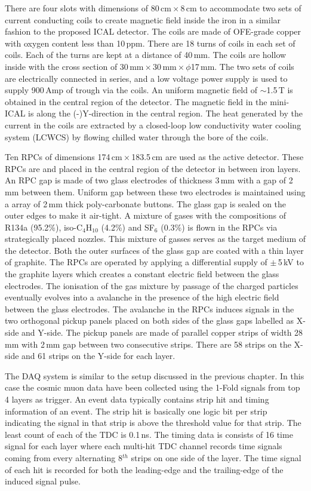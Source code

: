 There are four slots with dimensions of 80\,cm\,$\times$\,8\,cm to
accommodate two sets of current conducting coils to create magnetic
field inside the iron in a similar fashion to the proposed
ICAL detector. The coils are made of OFE-grade copper with
oxygen content less than 10\,ppm. There are 18 turns of coils in each
set of coils. Each of the turns are kept at a distance of 40\,mm.
The coils are hollow inside with the cross section of
30\,mm\,$\times$\,30\,mm\,$\times$\,$\phi$17\,mm.
The two sets of coils are electrically connected in series,
and a low voltage power supply is used to supply 900\,Amp
of trough via the coils. An uniform magnetic field of $\sim$1.5\,T
is obtained in the central region of the detector. The magnetic field
in the mini-ICAL is along the (-)Y-direction in the central region.
The heat generated by the current in the
coils are extracted by a closed-loop low conductivity water cooling
system (LCWCS) by flowing chilled water through the bore of the coils.

Ten RPCs of dimensions 174\,cm\,$\times$\,183.5\,cm are used as the
active detector. These RPCs are and placed in the central region of
the detector in between iron layers.
An RPC gap is made of two glass electrodes of thickness 3\,mm with
a gap of 2\,mm between them. Uniform gap between these two electrodes
is maintained using a array of 2\,mm thick poly-carbonate buttons.
The glass gap is sealed on the outer edges to make it air-tight.
A mixture of gases with the compositions of R134a (95.2\%),
iso-C$_4$H$_{10}$ (4.2\%) and SF$_6$ (0.3\%) is flown in the RPCs
via strategically placed nozzles. This mixture of gasses serves as the
target medium of the detector.
Both the outer surfaces of the glass gap are coated with a thin layer
of graphite. The RPCs are operated by applying a differential supply of
$\pm$\,5\,kV to the graphite layers which creates a constant electric
field between the glass electrodes. The ionisation of the gas mixture
by passage of the charged particles eventually evolves into a
avalanche in the presence of the high electric field between the glass
electrodes. The avalanche in the RPCs induces signals in the two
orthogonal pickup panels placed on both sides of the glass gaps
labelled as X-side and Y-side. The pickup panels are made of parallel
copper strips of width 28\,mm with 2\,mm gap between two consecutive
strips. There are 58 strips on the X-side and 61 strips on the
Y-side for each layer.

The DAQ system is similar to the setup discussed in the previous
chapter. In this case the cosmic muon data have been collected using
the 1-Fold signals from top 4 layers as trigger.
An event data typically contains strip hit and timing information
of an event. The strip hit is basically one logic bit per strip
indicating the signal in that strip is above the threshold value
for that strip. The least count of each of the TDC is 0.1\,ns.
The timing data is consists of 16 time signal for
each layer where each multi-hit TDC channel records time signals
coming from every alternating 8$^{th}$ strips on one side of the layer.
The time signal of each hit is recorded for both the leading-edge and
the trailing-edge of the induced signal pulse.


